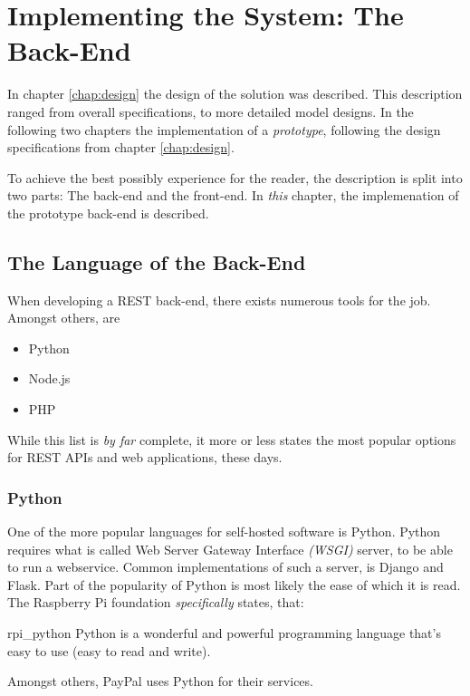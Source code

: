 \chapter{Implementing the System: The Back-End}
	\label{chap:impl:backend}
	In chapter \ref{chap:design} the design of the solution was described. This description ranged from overall specifications, to more detailed model designs. In the following two chapters the implementation of a \emph{prototype}, following the design specifications from chapter \ref{chap:design}.

	To achieve the best possibly experience for the reader, the description is split into two parts: The back-end and the front-end. In \emph{this} chapter, the implemenation of the prototype back-end is described.


	\section{The Language of the Back-End}
		When developing a REST back-end, there exists numerous tools for the job. Amongst others, are
		\begin{itemize}
			\item Python
			\item Node.js
			\item PHP
		\end{itemize}
		While this list is \emph{by far} complete, it more or less states the most popular options for REST APIs and web applications, these days.

		\subsection{Python}
			One of the more popular languages for self-hosted software is Python. Python requires what is called Web Server Gateway Interface \emph{(WSGI)} server, to be able to run a webservice. Common implementations of such a server, is Django and Flask. Part of the popularity of Python is most likely the ease of which it is read. The Raspberry Pi foundation \emph{specifically} states, that:
			\begin{citequote}{rpi_python}
				Python is a wonderful and powerful programming language that's easy to use (easy to read and write).
			\end{citequote}

			 Amongst others, PayPal uses Python for their services.

